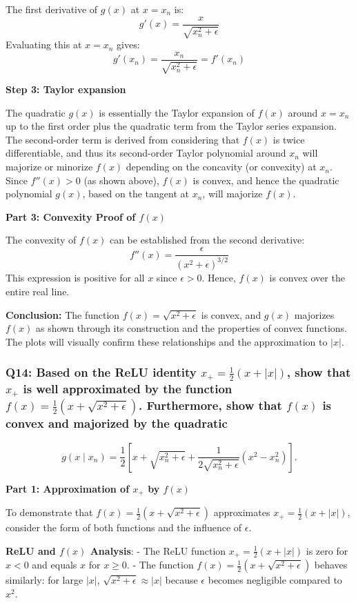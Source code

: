 \documentclass[8pt]{article}
\begin{document}
The first derivative of \( g(x) \) at \( x = x_n \) is:
\[ g'(x) = \frac{x}{\sqrt{x_n^2 + \epsilon}} \]
Evaluating this at \( x = x_n \) gives:
\[ g'(x_n) = \frac{x_n}{\sqrt{x_n^2 + \epsilon}} = f'(x_n) \]

\textbf{Step 3: Taylor expansion}

The quadratic \( g(x) \) is essentially the Taylor expansion of \( f(x) \) around \( x = x_n \) up to the first order plus the quadratic term from the Taylor series expansion. The second-order term is derived from considering that \( f(x) \) is twice differentiable, and thus its second-order Taylor polynomial around \( x_n \) will majorize or minorize \( f(x) \) depending on the concavity (or convexity) at \( x_n \). Since \( f''(x) > 0 \) (as shown above), \( f(x) \) is convex, and hence the quadratic polynomial \( g(x) \), based on the tangent at \( x_n \), will majorize \( f(x) \).

\textbf{Part 3: Convexity Proof of \( f(x) \)}

The convexity of \( f(x) \) can be established from the second derivative:
\[ f''(x) = \frac{\epsilon}{(x^2 + \epsilon)^{3/2}} \]
This expression is positive for all \( x \) since \( \epsilon > 0 \). Hence, \( f(x) \) is convex over the entire real line.

\textbf{Conclusion:} The function \( f(x) = \sqrt{x^2 + \epsilon} \) is convex, and \( g(x) \) majorizes \( f(x) \) as shown through its construction and the properties of convex functions. The plots will visually confirm these relationships and the approximation to \( |x| \).

\subsubsection*{Q14: Based on the ReLU identity \( x_+ = \frac{1}{2} (x + |x|) \), show that \( x_+ \) is well approximated by the function \( f(x) = \frac{1}{2} (x + \sqrt{x^2 + \epsilon}) \). Furthermore, show that \( f(x) \) is convex and majorized by the quadratic}
\[
g(x \mid x_n) = \frac{1}{2} \left[ x + \sqrt{x_n^2 + \epsilon} + \frac{1}{2\sqrt{x_n^2 + \epsilon}} (x^2 - x_n^2) \right].
\]

\textbf{Part 1: Approximation of \( x_+ \) by \( f(x) \)}

To demonstrate that \( f(x) = \frac{1}{2} (x + \sqrt{x^2 + \epsilon}) \) approximates \( x_+ = \frac{1}{2} (x + |x|) \), consider the form of both functions and the influence of \(\epsilon\).

\textbf{ReLU and \( f(x) \) Analysis}:
- The ReLU function \( x_+ = \frac{1}{2} (x + |x|) \) is zero for \( x < 0 \) and equals \( x \) for \( x \geq 0 \).
- The function \( f(x) = \frac{1}{2} (x + \sqrt{x^2 + \epsilon}) \) behaves similarly: for large \( |x| \), \( \sqrt{x^2 + \epsilon} \approx |x| \) because \(\epsilon\) becomes negligible compared to \(x^2\).
\end{document}
